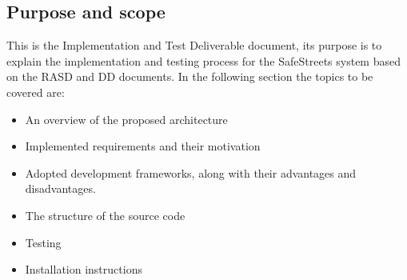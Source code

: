 \subsection{Purpose and scope}

This is the Implementation and Test Deliverable document, its purpose is to explain the implementation and testing process for the SafeStreets system based on the RASD and DD documents.
In the following section the topics to be covered are:

\begin{itemize}
    \item 
    An overview of the proposed architecture
    \item 
    Implemented requirements and their motivation
    \item 
    Adopted development frameworks, along with their advantages and disadvantages.
    \item 
    The structure of the source code
    \item 
    Testing
    \item 
    Installation instructions
\end{itemize}